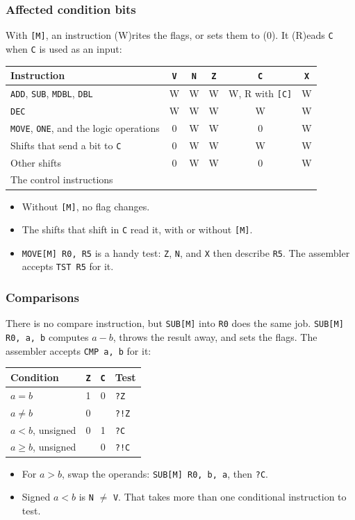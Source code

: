 \documentclass{beamer}
\newcommand{\code}[1]{\texttt{#1}}
\begin{document}
   \begin{frame}
    \frametitle{Affected condition bits}
    With \code{[M]}, an instruction (W)rites the flags, or sets them to
    (0). It (R)eads \code{C} when \code{C} is used as an input:
    {\small
    \begin{center}
     \begin{tabular}{|l|c|c|c|c|c|}
      \hline
       Instruction&\code{V}&\code{N}&\code{Z}&\code{C}&\code{X}\\
      \hline
       \code{ADD}, \code{SUB}, \code{MDBL}, \code{DBL}&W&W&W&W, R with \code{[C]}&W\\
       \code{DEC}&W&W&W&W&W\\
       \code{MOVE}, \code{ONE}, and the logic operations&0&W&W&0&W\\
       Shifts that send a bit to \code{C}&0&W&W&W&W\\
       Other shifts&0&W&W&0&W\\
       The control instructions&&&&&\\
      \hline
     \end{tabular}
    \end{center}
    }
    \begin{itemize}
     \item Without \code{[M]}, no flag changes.
     \item The shifts that shift in \code{C} read it, with or without
      \code{[M]}.
     \item \code{MOVE[M] R0, R5} is a handy test: \code{Z}, \code{N},
      and \code{X} then describe \code{R5}. The assembler accepts
      \code{TST R5} for it.
    \end{itemize}
   \end{frame}
%
   \begin{frame}
    \frametitle{Comparisons}
    There is no compare instruction, but \code{SUB[M]} into \code{R0} does
    the same job. \code{SUB[M] R0, a, b} computes $a - b$, throws the
    result away, and sets the flags. The assembler accepts \code{CMP a, b}
    for it:
    \begin{center}
     \begin{tabular}{|l|c|c|l|}
      \hline
       Condition&\code{Z}&\code{C}&Test\\
      \hline
       $a = b$&1&0&\code{?Z}\\
       $a \neq b$&0&&\code{?!Z}\\
       $a < b$, unsigned&0&1&\code{?C}\\
       $a \geq b$, unsigned&&0&\code{?!C}\\
      \hline
     \end{tabular}
    \end{center}
    \begin{itemize}
     \item For $a > b$, swap the operands: \code{SUB[M] R0, b, a}, then
      \code{?C}.
     \item Signed $a < b$ is \code{N} $\ne$ \code{V}. That takes more than
      one conditional instruction to test.
    \end{itemize}
   \end{frame}
\end{document}
